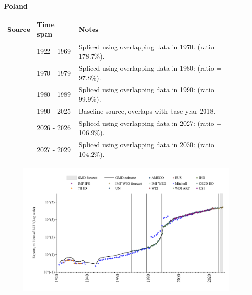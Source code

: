 \documentclass[12pt,a4paper,landscape]{article}
\begin{document}
\begin{adjustbox}{max totalsize={\paperwidth}{\paperheight},center}
\begin{minipage}[t][\textheight][t]{\textwidth}
\vspace*{0.5cm}
{}
\begin{center}
{\Large\bfseries Poland}
\end{center}
\vspace{0.5cm}
\begin{table}[H]
\centering
\small
\begin{tabular}{|l|l|l|}
\hline
\textbf{Source} & \textbf{Time span} & \textbf{Notes} \\
\hline
\rowcolor{white}\cite{Mitchell}& 1922 - 1969 &Spliced using overlapping data in 1970: (ratio = 178.7\%).\\
\rowcolor{lightgray}\cite{UN}& 1970 - 1979 &Spliced using overlapping data in 1980: (ratio = 97.8\%).\\
\rowcolor{white}\cite{AMECO}& 1980 - 1989 &Spliced using overlapping data in 1990: (ratio = 99.9\%).\\
\rowcolor{lightgray}\cite{OECD_EO}& 1990 - 2025 &Baseline source, overlaps with base year 2018.\\
\rowcolor{white}\cite{AMECO}& 2026 - 2026 &Spliced using overlapping data in 2027: (ratio = 106.9\%).\\
\rowcolor{lightgray}\cite{IMF_WEO_forecast}& 2027 - 2029 &Spliced using overlapping data in 2030: (ratio = 104.2\%).\\
\hline
\end{tabular}
\end{table}
\begin{figure}[H]
\centering
\includegraphics[width=\textwidth,height=0.6\textheight,keepaspectratio]{graphs/POL_exports.pdf}
\end{figure}
\end{minipage}
\end{adjustbox}
\end{document}
